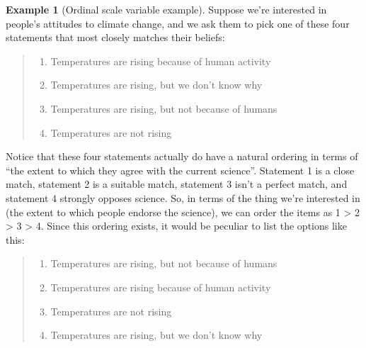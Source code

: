 \documentclass[
  11pt,
]{book}
\providecommand{\tightlist}{%
  \setlength{\itemsep}{0pt}\setlength{\parskip}{0pt}}
\theoremstyle{definition}
\theoremstyle{definition}
\newtheorem{example}{Example}[chapter]
\theoremstyle{definition}
\theoremstyle{definition}
\theoremstyle{remark}
\begin{document}
\begin{example}[Ordinal scale variable example]
\protect\hypertarget{exm:exordinal}{}\label{exm:exordinal}Suppose we're interested in people's attitudes to climate change, and we ask them to pick one of these four statements that most closely matches their beliefs:

\begin{keepTogether}

\begin{quote}
\begin{enumerate}
\def\labelenumi{(\arabic{enumi})}
\tightlist
\item
  Temperatures are rising because of human activity
\item
  Temperatures are rising, but we don't know why
\item
  Temperatures are rising, but not because of humans
\item
  Temperatures are not rising
\end{enumerate}
\end{quote}

\end{keepTogether}

Notice that these four statements actually do have a natural ordering in terms of ``the extent to which they agree with the current science''. Statement 1 is a close match, statement 2 is a suitable match, statement 3 isn't a perfect match, and statement 4 strongly opposes science. So, in terms of the thing we're interested in (the extent to which people endorse the science), we can order the items as 1 \textgreater{} 2 \textgreater{} 3 \textgreater{} 4. Since this ordering exists, it would be peculiar to list the options like this:

\begin{keepTogether}

\begin{quote}
\begin{enumerate}
\def\labelenumi{(\arabic{enumi})}
\setcounter{enumi}{2}
\tightlist
\item
  Temperatures are rising, but not because of humans
\item
  Temperatures are rising because of human activity
\item
  Temperatures are not rising
\item
  Temperatures are rising, but we don't know why
\end{enumerate}
\end{quote}


\end{keepTogether}
\end{example}
\end{document}
